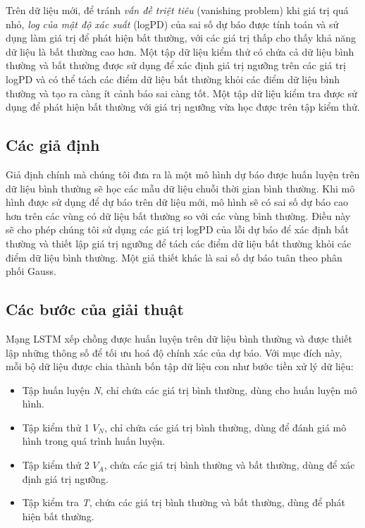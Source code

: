 Trên dữ liệu mới, để tránh \textit{vấn đề triệt tiêu} (vanishing problem) khi giá trị quá nhỏ, \textit{log của mật độ xác suất} (logPD) của sai số dự báo được tính toán và sử dụng làm giá trị để phát hiện bất thường, với các giá trị thấp cho thấy khả năng dữ liệu là bất thường cao hơn. Một tập dữ liệu kiểm thử có chứa cả dữ liệu bình thường và bất thường được sử dụng để xác định giá trị ngưỡng trên các giá trị logPD và có thể tách các điểm dữ liệu bất thường khỏi các điểm dữ liệu bình thường và tạo ra càng ít cảnh báo sai càng tốt. Một tập dữ liệu kiểm tra được sử dụng để phát hiện bất thường với giá trị ngưỡng vừa học được trên tập kiểm thử.

\subsection{Các giả định}
Giả định chính mà chúng tôi đưa ra là một mô hình dự báo được huấn luyện trên dữ liệu bình thường sẽ học các mẫu dữ liệu chuỗi thời gian bình thường. Khi mô hình được sử dụng để dự báo trên dữ liệu mới, mô hình sẽ có sai số dự báo cao hơn trên các vùng có dữ liệu bất thường so với các vùng bình thường. Điều này sẽ cho phép chúng tôi sử dụng các giá trị logPD của lỗi dự báo để xác định bất thường và thiết lập giá trị ngưỡng để tách các điểm dữ liệu bất thường khỏi các điểm dữ liệu bình thường. Một giả thiết khác là sai số dự báo tuân theo phân phối Gauss.

\subsection{Các bước của giải thuật}
Mạng LSTM xếp chồng được huấn luyện trên dữ liệu bình thường và được thiết lập những thông số để tối ưu hoá độ chính xác của dự báo. Với mục đích này, mỗi bộ dữ liệu được chia thành bốn tập dữ liệu con như bước tiền xử lý dữ liệu:

\begin{itemize}
\item Tập huấn luyện \textit{N}, chỉ chứa các giá trị bình thường, dùng cho huấn luyện mô hình.
\item Tập kiểm thử 1 $V_{N}$, chỉ chứa các giá trị bình thường, dùng để đánh giá mô hình trong quá trình huấn luyện.
\item Tập kiểm thử 2 $V_{A}$, chứa các giá trị bình thường và bất thường, dùng để xác định giá trị ngưỡng.
\item Tập kiểm tra \textit{T}, chứa các giá trị bình thường và bất thường, dùng để phát hiện bất thường. 
\end{itemize}

